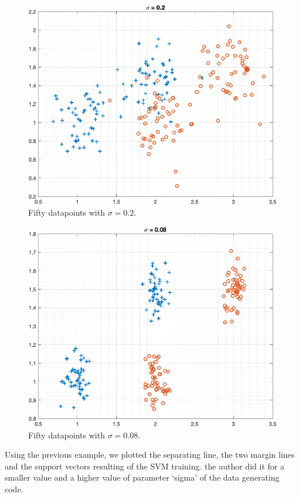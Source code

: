 \documentclass[journal]{IEEEtran}
\begin{document}
\begin{figure}[ht]
    \centering
    \includegraphics[width=\linewidth]{figure05.png}
    \caption{Fifty datapoints with \( \sigma = 0.2\).}
    \label{fig:data1}
\end{figure}

\begin{figure}[ht]
    \centering
    \includegraphics[width=\linewidth]{figure04.png}
    \caption{Fifty datapoints with \( \sigma = 0.08 \).}
    \label{fig:data2}
\end{figure}

Using the previous example, we plotted the separating line, the two margin lines and the support vectors resulting of the SVM training. the author did it for a smaller value and a higher value of parameter `sigma' of the data generating code.
\end{document}
